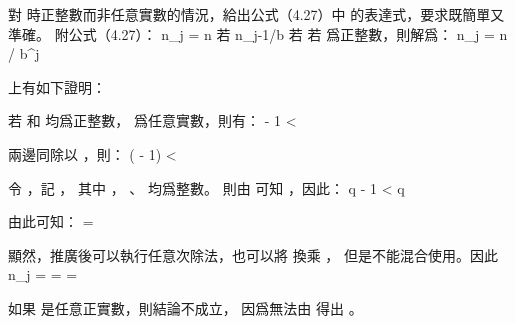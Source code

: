\startsection[
  title={Proof of the master theorem},
]

\startEXERCISE \DIFFICULT
對  時正整數而非任意實數的情況，給出公式（4.27）中  的表達式，要求既簡單又準確。
附公式（4.27）：
\startformula
 n_j = \startmathcases
   \NC n \NC 若  \NR
   \NC \left\lceil n_{j-1}/b \right\rceil \NC 若  \NR
\stopmathcases
\stopformula
\stopEXERCISE
\startANSWER
若  爲正整數，則解爲：
\startformula
n_j = \left\lceil n / b^j \right\rceil
\stopformula

 上有如下證明：

若  和  均爲正整數，  爲任意實數，則有：
\startformula
\left\lceil {} \right\rceil - 1
< 
\le \left\lceil {} \right\rceil
\stopformula

兩邊同除以 ，則：
\startformula
{}(\left\lceil {} \right\rceil - 1)
< 
\le {} \left\lceil {} \right\rceil
\stopformula

令 ，記 ，
其中 ， 、  均爲整數。
則由  可知 ，因此：
\startformula
q - 1 \le {} <  \le {} \le q
\stopformula

由此可知：
\startformula
\left\lceil {} \right\rceil = \left\lceil {} \left\lceil {} \right\rceil \right\rceil
\stopformula

顯然，推廣後可以執行任意次除法，也可以將 \m{\left\lceil \right\rceil} 換乘 \m{\lfloor \rfloor}，
但是不能混合使用。因此
\startformula
n_j = \left\lceil {} \right\rceil
    = \left\lceil {} \left\lceil {} \right\rceil \right\rceil
    = \left\lceil {} \right\rceil
\stopformula

如果  是任意正實數，則結論不成立，
因爲無法由  得出 。
\stopANSWER

